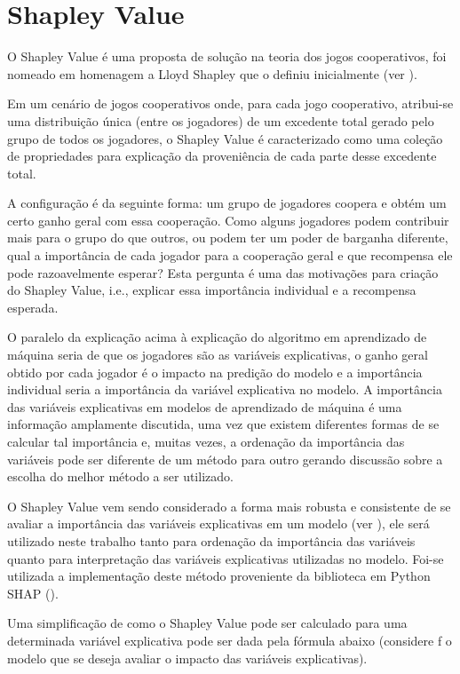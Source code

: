 \section{Shapley Value}
\label{sec:shapley_value}

O Shapley Value é uma proposta de solução na teoria dos jogos cooperativos, foi nomeado em homenagem a Lloyd Shapley que o definiu inicialmente (ver \citet{Shapley1953}).

Em um cenário de jogos cooperativos onde, para cada jogo cooperativo, atribui-se uma distribuição única (entre os jogadores) de um excedente total gerado pelo grupo de todos os jogadores, o Shapley Value é caracterizado como uma coleção de propriedades para explicação da proveniência de cada parte desse excedente total.

A configuração é da seguinte forma: um grupo de jogadores coopera e obtém um certo ganho geral com essa cooperação. Como alguns jogadores podem contribuir mais para o grupo do que outros, ou podem ter um poder de barganha diferente, qual a importância de cada jogador para a cooperação geral e que recompensa ele pode razoavelmente esperar? Esta pergunta é uma das motivações para criação do Shapley Value, i.e., explicar essa importância individual e a recompensa esperada.

O paralelo da explicação acima à explicação do algoritmo em aprendizado de máquina seria de que os jogadores são as variáveis explicativas, o ganho geral obtido por cada jogador é o impacto na predição do modelo e a importância individual seria a importância da variável explicativa no modelo. A importância das variáveis explicativas em modelos de aprendizado de máquina é uma informação amplamente discutida, uma vez que existem diferentes formas de se calcular tal importância e, muitas vezes, a ordenação da importância das variáveis pode ser diferente de um método para outro gerando discussão sobre a escolha do melhor método a ser utilizado.

O Shapley Value vem sendo considerado a forma mais robusta e consistente de se avaliar a importância das variáveis explicativas em um modelo (ver \citet{Lundberg2017}), ele será utilizado neste trabalho tanto para ordenação da importância das variáveis quanto para interpretação das variáveis explicativas utilizadas no modelo. Foi-se utilizada a implementação deste método proveniente da biblioteca em Python SHAP (\citet{Shap}).

Uma simplificação de como o Shapley Value pode ser calculado para uma determinada variável explicativa pode ser dada pela fórmula abaixo (considere f o modelo que se deseja avaliar o impacto das variáveis explicativas).

